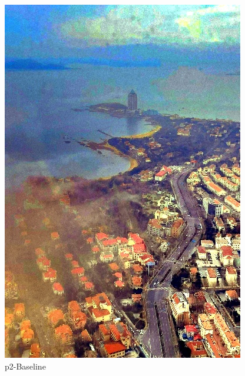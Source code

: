 \documentclass[12pt]{article}
\begin{document}
\begin{figure}[!h]
\begin{minipage}[t]{0.24\linewidth}
        \includegraphics[width=0.9\linewidth]{sample_pictures/after_p2_Baseline.jpg}
        \caption*{p2-Baseline}
    \end{minipage}
    \begin{minipage}[t]{0.24\linewidth}
        \centering

\end{minipage}
\end{figure}
\end{document}
